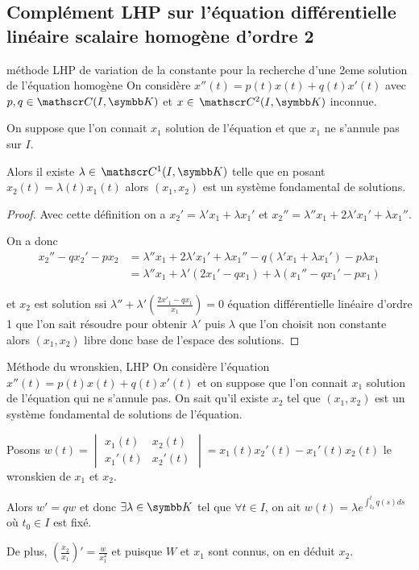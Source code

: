 \subsection{Complément LHP sur l'équation différentielle linéaire scalaire homogène d'ordre 2}

\begin{propositionnt}{méthode LHP de variation de la constante pour la recherche d'une 2eme solution de l'équation homogène}{}
    On considère $x''(t) = p(t) x(t) + q(t) x'(t)$ avec $p, q \in \mathscr C(I, \K)$ et $x \in \mc 2(I, \K)$ inconnue.
    
    On suppose que l'on connait $x_1$ solution de l'équation et que $x_1$ ne s'annule pas sur $I$. 

    Alors il existe $\lambda \in \mc 1(I, \K)$ telle que en posant $x_2(t) = \lambda(t) x_1(t)$
    alors $(x_1, x_2)$ est un système fondamental de solutions. 
\end{propositionnt}

\begin{proof}
    Avec cette définition on a $x_2' = \lambda' x_1 + \lambda x_1'$ et 
    $x_2'' = \lambda'' x_1 + 2 \lambda' x_1' + \lambda x_1''$.

    On a donc 
    \begin{align}
        x_2'' - qx_2' - px_2 & = \lambda'' x_1 + 2 \lambda' x_1' + \lambda x_1'' - q (\lambda' x_1 + \lambda x_1') - p \lambda x_1 \\
        & = \lambda'' x_1 + \lambda'(2 x_1' - q x_1) + \lambda (x_1'' - q x_1' - p x_1) 
    \end{align}

    et $x_2$ est solution ssi $\lambda'' + \lambda' \left( \frac{2x'_1 - qx_1}{x_1} \right) = 0$
    équation différentielle linéaire d'ordre 1 que l'on sait résoudre pour obtenir $\lambda'$ puis 
    $\lambda$ que l'on choisit non constante alors $(x_1, x_2)$ libre donc base de l'espace des solutions. 
\end{proof}

\begin{proposition}{Méthode du wronskien, LHP}{}
    On considère l'équation $x''(t) = p(t) x(t) + q(t) x'(t)$  et on suppose que 
    l'on connait $x_1$ solution de l'équation qui ne s'annule pas. On sait qu'il existe $x_2$
    tel que $(x_1, x_2)$ est un système fondamental de solutions de l'équation.

    Posons $w(t) = \begin{vmatrix}
    x_1(t) & x_2(t) \\
    x_1'(t) & x_2'(t)
    \end{vmatrix} = x_1(t) x_2'(t) - x_1'(t) x_2(t)$ le wronskien de $x_1$ et $x_2$.

    Alors $w' = q w$ et donc $\exists \lambda \in \K$ tel que $\forall t \in I$, 
    on ait $w(t) = \lambda e^{\int_{t_0}^t q(s) ds}$ où $t_0 \in I$ est fixé.

    De plus, $\left( \frac{x_2}{x_1} \right)' = \frac{w}{x_1^2}$ et puisque 
    $W$ et $x_1$ sont connus, on en déduit $x_2$. 
\end{proposition}